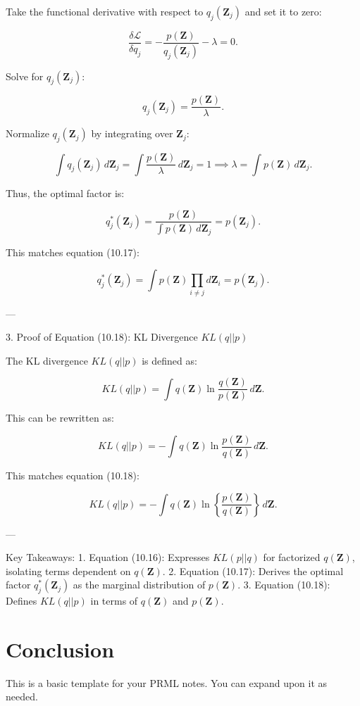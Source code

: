 \documentclass{article}
\begin{document}
Take the functional derivative with respect to \( q_j(\mathbf{Z}_j) \) and set it to zero:

\[
\frac{\delta \mathcal{L}}{\delta q_j} = -\frac{p(\mathbf{Z})}{q_j(\mathbf{Z}_j)} - \lambda = 0.
\]

Solve for \( q_j(\mathbf{Z}_j) \):

\[
q_j(\mathbf{Z}_j) = \frac{p(\mathbf{Z})}{\lambda}.
\]

Normalize \( q_j(\mathbf{Z}_j) \) by integrating over \( \mathbf{Z}_j \):

\[
\int q_j(\mathbf{Z}_j) \, d\mathbf{Z}_j = \int \frac{p(\mathbf{Z})}{\lambda} \, d\mathbf{Z}_j = 1 \implies \lambda = \int p(\mathbf{Z}) \, d\mathbf{Z}_j.
\]

Thus, the optimal factor is:

\[
q_j^*(\mathbf{Z}_j) = \frac{p(\mathbf{Z})}{\int p(\mathbf{Z}) \, d\mathbf{Z}_j} = p(\mathbf{Z}_j).
\]

This matches equation (10.17):

\[
q_j^*(\mathbf{Z}_j) = \int p(\mathbf{Z}) \prod_{i \neq j} d\mathbf{Z}_i = p(\mathbf{Z}_j).
\]

---

 3. Proof of Equation (10.18): KL Divergence \( KL(q||p) \)

The KL divergence \( KL(q||p) \) is defined as:

\[
KL(q||p) = \int q(\mathbf{Z}) \ln \frac{q(\mathbf{Z})}{p(\mathbf{Z})} \, d\mathbf{Z}.
\]

This can be rewritten as:

\[
KL(q||p) = -\int q(\mathbf{Z}) \ln \frac{p(\mathbf{Z})}{q(\mathbf{Z})} \, d\mathbf{Z}.
\]

This matches equation (10.18):

\[
KL(q||p) = -\int q(\mathbf{Z}) \ln \left\{ \frac{p(\mathbf{Z})}{q(\mathbf{Z})} \right\} \, d\mathbf{Z}.
\]

---


 Key Takeaways:
1. Equation (10.16): Expresses \( KL(p||q) \) for factorized \( q(\mathbf{Z}) \), isolating terms dependent on \( q(\mathbf{Z}) \).
2. Equation (10.17): Derives the optimal factor \( q_j^*(\mathbf{Z}_j) \) as the marginal distribution of \( p(\mathbf{Z}) \).
3. Equation (10.18): Defines \( KL(q||p) \) in terms of \( q(\mathbf{Z}) \) and \( p(\mathbf{Z}) \). \\


\section{Conclusion}
This is a basic template for your PRML notes. You can expand upon it as needed.
\end{document}
